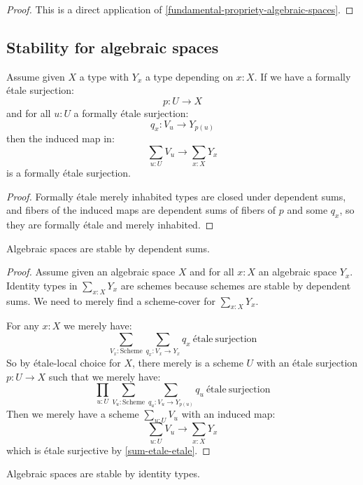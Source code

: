 \begin{proof}
This is a direct application of \cref{fundamental-propriety-algebraic-spaces}.
\end{proof}

\subsection{Stability for algebraic spaces}

\begin{lemma}\label{sum-etale-etale}
Assume given $X$ a type with $Y_x$ a type depending on $x:X$. If we have a formally étale surjection:
\[p:U\to X\]
and for all $u:U$ a formally étale surjection:
\[q_x : V_u \to Y_{p(u)}\]
then the induced map in:
\[\sum_{u:U} V_u \to \sum_{x:X}Y_x\]
is a formally étale surjection.
\end{lemma}

\begin{proof}
Formally étale merely inhabited types are closed under dependent sums, and fibers of the induced maps are dependent sums of fibers of $p$ and some $q_x$, so they are formally étale and merely inhabited.
\end{proof}

\begin{lemma}\label{algebraic-space-sum}
Algebraic spaces are stable by dependent sums.
\end{lemma}

\begin{proof}
Assume given an algebraic space $X$ and for all $x:X$ an algebraic space $Y_x$. Identity types in $\sum_{x:X} Y_x$ are schemes because schemes are stable by dependent sums. We need to merely find a scheme-cover for $\sum_{x:X} Y_x$. 

For any $x:X$ we merely have:
\[\sum_{V_x:\mathrm{Scheme}} \sum_{q_x: V_x \to Y_x} q_x\ \mathrm{étale\ surjection}\]
So by étale-local choice for $X$, there merely is a scheme $U$ with an étale surjection $p: U \to X$ such that we merely have:
\[\prod_{u:U} \sum_{V_u:\mathrm{Scheme}} \sum_{q_u: V_u \to Y_{p(u)}} q_u\ \mathrm{étale\ surjection}\]
Then we merely have a scheme $\sum_{u:U}V_u$ with an induced map:
\[\sum_{u:U}V_u \to \sum_{x:X} Y_x\]
which is étale surjective by \cref{sum-etale-etale}.
\end{proof}

\begin{lemma}\label{algebraic-space-identity}
Algebraic spaces are stable by identity types.
\end{lemma}

